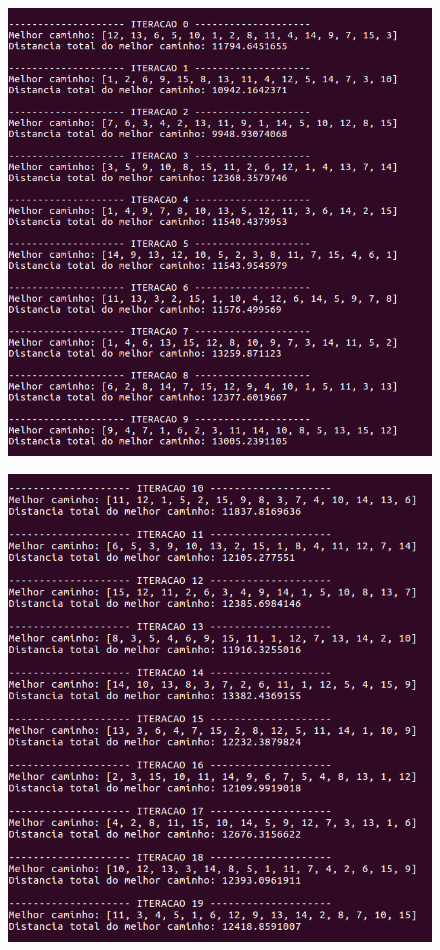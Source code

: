 \documentclass[hidelinks,12pt]{article}
\begin{document}
		\begin{figure}[!h]
			\centering
			\includegraphics[scale=0.6]{Figures/m15-2-1.png}
		\end{figure}

		\newpage
		
		\begin{figure}[!h]
			\centering
			\includegraphics[scale=0.6]{Figures/m15-2-2.png}
		\end{figure}
\end{document}
